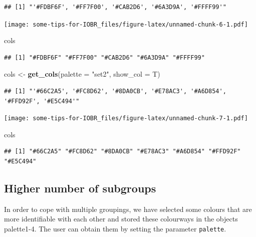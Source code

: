 \documentclass[
  12pt,
]{book}
\newenvironment{Shaded}{\begin{snugshade}}{\end{snugshade}}
\newcommand{\AttributeTok}[1]{\textcolor[rgb]{0.13,0.29,0.53}{#1}}
\newcommand{\FunctionTok}[1]{\textcolor[rgb]{0.13,0.29,0.53}{\textbf{#1}}}
\newcommand{\NormalTok}[1]{#1}
\newcommand{\OtherTok}[1]{\textcolor[rgb]{0.56,0.35,0.01}{#1}}
\newcommand{\StringTok}[1]{\textcolor[rgb]{0.31,0.60,0.02}{#1}}
\begin{document}
\begin{verbatim}
## [1] "'#FDBF6F', '#FF7F00', '#CAB2D6', '#6A3D9A', '#FFFF99'"
\end{verbatim}

\texttt{[image: some-tips-for-IOBR\_files/figure-latex/unnamed-chunk-6-1.pdf]}

\begin{Shaded}
\begin{Highlighting}[]
\NormalTok{cols}
\end{Highlighting}
\end{Shaded}

\begin{verbatim}
## [1] "#FDBF6F" "#FF7F00" "#CAB2D6" "#6A3D9A" "#FFFF99"
\end{verbatim}

\begin{Shaded}
\begin{Highlighting}[]
\NormalTok{cols }\OtherTok{\textless{}{-}} \FunctionTok{get\_cols}\NormalTok{(}\AttributeTok{palette =} \StringTok{"set2"}\NormalTok{, }\AttributeTok{show\_col =}\NormalTok{ T)}
\end{Highlighting}
\end{Shaded}

\begin{verbatim}
## [1] "'#66C2A5', '#FC8D62', '#8DA0CB', '#E78AC3', '#A6D854', '#FFD92F', '#E5C494'"
\end{verbatim}

\texttt{[image: some-tips-for-IOBR\_files/figure-latex/unnamed-chunk-7-1.pdf]}

\begin{Shaded}
\begin{Highlighting}[]
\NormalTok{cols}
\end{Highlighting}
\end{Shaded}

\begin{verbatim}
## [1] "#66C2A5" "#FC8D62" "#8DA0CB" "#E78AC3" "#A6D854" "#FFD92F" "#E5C494"
\end{verbatim}

\hypertarget{higher-number-of-subgroups}{%
\subsection{Higher number of subgroups}\label{higher-number-of-subgroups}}

In order to cope with multiple groupings, we have selected some colours that are more identifiable with each other and stored these colourways in the objects palette1-4. The user can obtain them by setting the parameter \texttt{palette}.
\end{document}
